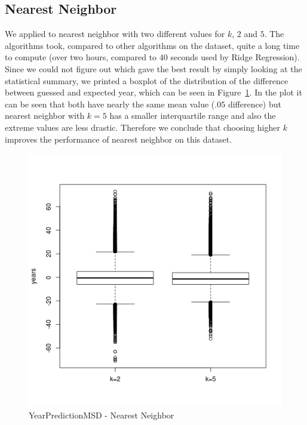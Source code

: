 \subsection{Nearest Neighbor}
We applied to nearest neighbor with two different values for $k$, $2$ and $5$. The algorithms took, compared to other algorithms on the dataset, quite a long time to compute (over two hours, compared to $40$ seconds used by Ridge Regression). Since we could not figure out which gave the best result by simply looking at the statistical summary, we printed a boxplot of the distribution of the difference between guessed and expected year, which can be seen in Figure~\ref{ypmsd:fig:nnrresults}. In the plot it can be seen that both have nearly the same mean value ($.05$ difference) but nearest neighbor with $k=5$ has a smaller interquartile range and also the extreme values are less drastic. Therefore we conclude that choosing higher $k$ improves the performance of nearest neighbor on this dataset.
\begin{figure}[p]
	\center
	\includegraphics[scale=\figurescaling]{figures/ypmsd_nnr.png}
	\caption{YearPredictionMSD - Nearest Neighbor\label{ypmsd:fig:nnrresults}}
\end{figure}
